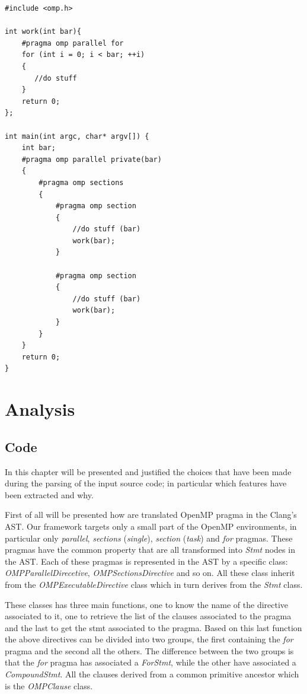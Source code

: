 \documentclass[a4paper,11pt,oneside]{book}
\begin{document}
\lstset{language=CCC}
\begin{lstlisting}[caption=Sample code, label=code]
#include <omp.h>

int work(int bar){
    #pragma omp parallel for
    for (int i = 0; i < bar; ++i)
    {
       //do stuff
    }  
    return 0;
};

int main(int argc, char* argv[]) {
    int bar;
    #pragma omp parallel private(bar)
    {
        #pragma omp sections
        {
            #pragma omp section
            {   
                //do stuff (bar)
                work(bar);
            }
            
            #pragma omp section
            {
                //do stuff (bar)
                work(bar);
            }
        }
    }
    return 0;
}

\end{lstlisting}


\section{Analysis}
\subsection{Code}

In this chapter will be presented and justified the choices that have been made during the parsing of the input source code; in particular which features have been extracted and why.

First of all will be presented how are translated OpenMP pragma in the Clang’s AST. Our framework targets only a small part of the OpenMP environments, in particular only \emph{parallel}, \emph{sections} (\emph{single}), \emph{section} (\emph{task}) and \emph{for} pragmas. These pragmas have the common property that are all transformed into \emph{Stmt} nodes in the AST. Each of these pragmas is represented in the AST by a specific class: \emph{OMPParallelDirecetive}, \emph{OMPSectionsDirective} and so on. All these class inherit from the \emph{OMPExecutableDirective} class which in turn derives from the \emph{Stmt} class. 

These classes has three main functions, one to know the name of the directive associated to it, one to retrieve the list of the clauses associated to the pragma and the last to get the stmt associated to the pragma. Based on this last function the above directives can be divided into two groups, the first containing the \emph{for} pragma and the second all the others. The difference between the two groups is that the \emph{for} pragma has associated a \emph{ForStmt}, while the other have associated a \emph{CompoundStmt}. All the clauses derived from a common primitive ancestor which is the \emph{OMPClause} class. 
\end{document}
